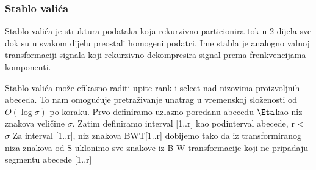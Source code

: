 \documentclass[11pt]{article}
\begin{document}
\newpage

\subsubsection{Stablo valića}

Stablo valića je struktura podataka koja rekurzivno particionira tok u 2 dijela sve dok su u svakom dijelu preostali homogeni podatci. Ime stabla je analogno valnoj transformaciji signala koji rekurzivno dekompresira signal prema frenkvencijama komponenti. 

Stablo valića može efikasno raditi upite rank i select nad nizovima proizvoljnih abeceda. To nam omogućuje pretraživanje unatrag u vremenskoj složenosti od  $O(\log\sigma)$ po koraku.
Prvo definiramo uzlazno poredanu abecedu $\Eta$kao niz znakova veličine $\sigma $.  
Zatim definiramo interval [1..r] kao podinterval abecede, r <= $\sigma$
Za interval [1..r], niz znakova BWT[1..r] dobijemo tako da iz transformiranog niza znakova od S uklonimo sve znakove iz B-W transformacije koji ne pripadaju segmentu abecede [1..r]
\end{document}
